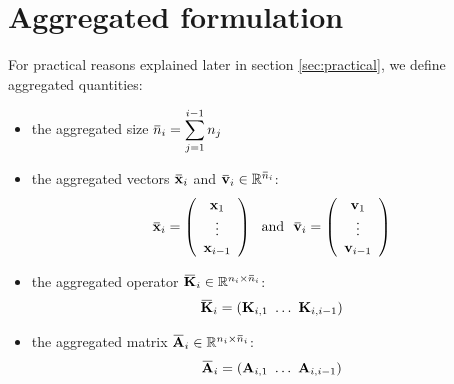 \documentclass[12pt]{scrartcl}
\newcommand{\overbar}[1]{\mkern 1.5mu\overline{\mkern-1.5mu#1\mkern-1.5mu}\mkern 1.5mu}
\begin{document}
\section{Aggregated formulation}
For practical reasons explained later in section \ref{sec:practical}, we define aggregated quantities:
\begin{itemize}
\item the aggregated size $\displaystyle \overbar{n}_i = \sum_{j=1}^{i-1} n_j$
\item the aggregated vectors $\overbar{\mathbf{x}}_i$ and $\overbar{\mathbf{v}}_i \in \mathbb{R}^{\overbar{n}_i}$:
\begin{align}
\overbar{\mathbf{x}}_i = \left(\begin{array}{c}
\mathbf{x}_1 \\
\vdots \\
\mathbf{x}_{i-1}
\end{array}
\right) \ \text{ and } \ \overbar{\mathbf{v}}_i = \left(\begin{array}{c}
\mathbf{v}_1 \\
\vdots \\
\mathbf{v}_{i-1}
\end{array}
\right)
\end{align}
\item the aggregated operator $\overbar{\mathbf{K}}_i \in \mathbb{R}^{n_i \times \overbar{n}_i}$:
\begin{align}
\overbar{\mathbf{K}}_i = \left(\mathbf{K}_{i,1} \ \dots \ \mathbf{K}_{i,i-1}\right)
\end{align}
\item the aggregated matrix $\overbar{\mathbf{A}}_i \in \mathbb{R}^{n_i \times \overbar{n}_i}$:
\begin{align}
\overbar{\mathbf{A}}_i = \left(\mathbf{A}_{i,1} \ \dots \ \mathbf{A}_{i,i-1}\right)
\end{align}
\end{itemize}
\end{document}
